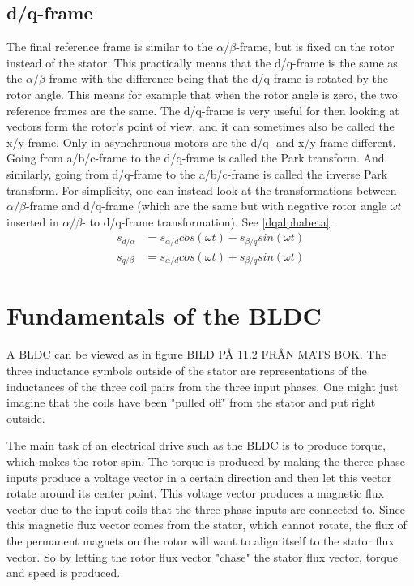 \documentclass{LTHthesis}
\begin{document}
\subsection{d/q-frame}
The final reference frame is similar to the $\alpha/\beta$-frame, but is fixed on the rotor instead of the stator. This practically means that the d/q-frame is the same as the $\alpha/\beta$-frame with the difference being that the d/q-frame is rotated by the rotor angle. This means for example that when the rotor angle is zero, the two reference frames are the same. The d/q-frame is very useful for then looking at vectors form the rotor's point of view, and it can sometimes also be called the x/y-frame. Only in asynchronous motors are the d/q- and x/y-frame different. Going from a/b/c-frame to the d/q-frame is called the Park transform. And similarly, going from d/q-frame to the a/b/c-frame is called the inverse Park transform. For simplicity, one can instead look at the transformations between $\alpha/\beta$-frame and d/q-frame (which are the same but with negative rotor angle $\omega t$ inserted in $\alpha/\beta$- to d/q-frame transformation). See \eqref{dqalphabeta}.
\begin{subequations} \label{dqalphabeta}
\begin{align} 
s_{d/\alpha}&=s_{\alpha/d}cos(\omega t)-s_{\beta/q}sin(\omega t)\\
s_{q/\beta}&=s_{\alpha/d}cos(\omega t)+s_{\beta/q}sin(\omega t)
\end{align}
\end{subequations}

\section{Fundamentals of the BLDC}
A BLDC can be viewed as in figure BILD PÅ 11.2 FRÅN MATS BOK. The three inductance symbols outside of the stator are representations of the inductances of the three coil pairs from the three input phases. One might just imagine that the coils have been "pulled off" from the stator and put right outside. 

The main task of an electrical drive such as the BLDC is to produce torque, which makes the rotor spin. The torque is produced by making the theree-phase inputs produce a voltage vector in a certain direction and then let this vector rotate around its center point. This voltage vector produces a magnetic flux vector due to the input coils that the three-phase inputs are connected to. Since this magnetic flux vector comes from the stator, which cannot rotate, the flux of the permanent magnets on the rotor will want to align itself to the stator flux vector. So by letting the rotor flux vector "chase" the stator flux vector, torque and speed is produced.
\end{document}
